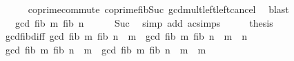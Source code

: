 \begin{isabellebody}
\ \ \ \ \isamarkupfalse%
\ coprime{\isacharunderscore}{\kern0pt}commute\ coprime{\isacharunderscore}{\kern0pt}fib{\isacharunderscore}{\kern0pt}Suc\ gcd{\isacharunderscore}{\kern0pt}mult{\isacharunderscore}{\kern0pt}left{\isacharunderscore}{\kern0pt}left{\isacharunderscore}{\kern0pt}cancel\ \isamarkupfalse%
\ blast\isanewline
\ \ \isamarkupfalse%
\ \isamarkupfalse%
\ {\isachardoublequoteopen}{\isasymdots}\ {\isacharequal}{\kern0pt}\ gcd\ {\isacharparenleft}{\kern0pt}fib\ m{\isacharparenright}{\kern0pt}\ {\isacharparenleft}{\kern0pt}fib\ n{\isacharparenright}{\kern0pt}{\isachardoublequoteclose}\isanewline
\ \ \ \ \isamarkupfalse%
\ Suc\ \isamarkupfalse%
\ {\isacharparenleft}{\kern0pt}simp\ add{\isacharcolon}{\kern0pt}\ ac{\isacharunderscore}{\kern0pt}simps{\isacharparenright}{\kern0pt}\isanewline
\ \ \isamarkupfalse%
\ \isamarkupfalse%
\ {\isacharquery}{\kern0pt}thesis\ \isakeywordONE{{\isachardot}{\kern0pt}}\isamarkupfalse%
\isanewline
{}\isamarkupfalse%
%
\endisatagproof
{\isafoldproof}%
%
\isadelimproof
\isanewline
%
\endisadelimproof
\isanewline
{}\isamarkupfalse%
\ gcd{\isacharunderscore}{\kern0pt}fib{\isacharunderscore}{\kern0pt}diff{\isacharcolon}{\kern0pt}\ {\isachardoublequoteopen}gcd\ {\isacharparenleft}{\kern0pt}fib\ m{\isacharparenright}{\kern0pt}\ {\isacharparenleft}{\kern0pt}fib\ {\isacharparenleft}{\kern0pt}n\ {\isacharminus}{\kern0pt}\ m{\isacharparenright}{\kern0pt}{\isacharparenright}{\kern0pt}\ {\isacharequal}{\kern0pt}\ gcd\ {\isacharparenleft}{\kern0pt}fib\ m{\isacharparenright}{\kern0pt}\ {\isacharparenleft}{\kern0pt}fib\ n{\isacharparenright}{\kern0pt}{\isachardoublequoteclose}\ \ {\isachardoublequoteopen}m\ {\isasymle}\ n{\isachardoublequoteclose}\isanewline
%
\isadelimproof
%
\endisadelimproof
%
\isatagproof
{}\isamarkupfalse%
\ {\isacharminus}{\kern0pt}\isanewline
\ \ \isamarkupfalse%
\ {\isachardoublequoteopen}gcd\ {\isacharparenleft}{\kern0pt}fib\ m{\isacharparenright}{\kern0pt}\ {\isacharparenleft}{\kern0pt}fib\ {\isacharparenleft}{\kern0pt}n\ {\isacharminus}{\kern0pt}\ m{\isacharparenright}{\kern0pt}{\isacharparenright}{\kern0pt}\ {\isacharequal}{\kern0pt}\ gcd\ {\isacharparenleft}{\kern0pt}fib\ m{\isacharparenright}{\kern0pt}\ {\isacharparenleft}{\kern0pt}fib\ {\isacharparenleft}{\kern0pt}n\ {\isacharminus}{\kern0pt}\ m\ {\isacharplus}{\kern0pt}\ m{\isacharparenright}{\kern0pt}{\isacharparenright}{\kern0pt}{\isachardoublequoteclose}\isanewline

\end{isabellebody}
